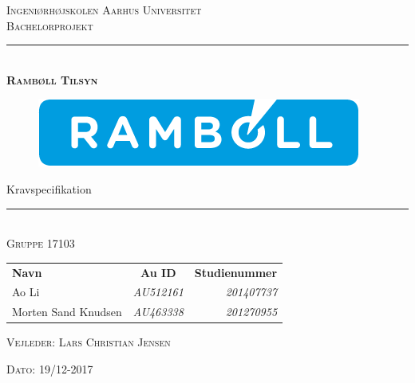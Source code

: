 \newcommand{\HRule}{\rule{\linewidth}{0.1mm}} %
\thispagestyle{empty}
\begin{center}
	\vspace{3cm}
	\textsc{\LARGE Ingeniørhøjskolen Aarhus Universitet}\\[1.5cm] %
	
	\textsc{\large Bachelorprojekt}\\[2.5 cm] 
	
	\HRule \\[0.8cm]
	{\huge \bfseries \textsc{Rambøll Tilsyn}} 
		\begin{figure}[h!]
		\centering
		\includegraphics[width=0.7\linewidth]{Forside/Logo}
	\end{figure}

	{\LARGE Kravspecifikation} \\[0.4cm]
	\HRule \\[1.5cm]
	
	\textsc{\large Gruppe 17103}\\
	\vspace{0.5 in}
	\begin{center}
		\begin{tabular}{l c r}
			\textbf{Navn} & \textbf{Au ID} & \textbf{Studienummer} \\
			Ao Li & \textsl{AU512161} & \textsl{201407737}    \\
			Morten Sand Knudsen & \textsl{AU463338} & \textsl{201270955}  \\
		\end{tabular}
	\end{center}
	\vspace{0.5 in}
	
	\textsc{\large Vejleder: Lars Christian Jensen}
	\vspace{0.5 in}
	
	\textsc{\large Dato: 19/12-2017}\\
	\vfill %
	
\end{center} %

\clearpage

\newpage